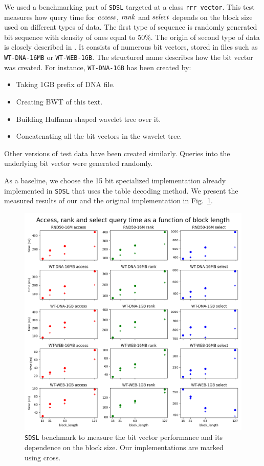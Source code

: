 We used a benchmarking part of \texttt{SDSL} targeted at a class \texttt{rrr\_vector}. This test
measures how query time for $\mathit{access}$, $\mathit{rank}$ and $\mathit{select}$ depends on the block size used on
different types of data. The first type of sequence is randomly generated bit sequence with
density of ones equal to 50\%. The origin of second type of data is closely described in
\cite{gog2014optimized}. It consists of numerous bit vectors, stored in files such as
\texttt{WT-DNA-16MB} or \texttt{WT-WEB-1GB}. The structured name describes how the bit vector
was created. For instance, \texttt{WT-DNA-1GB} has been created by:
\begin{itemize}
	\item Taking 1GB prefix of DNA file.
	\item Creating BWT of this text.
	\item Building Huffman shaped wavelet tree over it.
	\item Concatenating all the bit vectors in the wavelet tree.
\end{itemize}
Other versions of test data have been created similarly. Queries into the underlying bit vector
were generated randomly.

As a baseline, we choose the 15 bit specialized implementation already implemented in \texttt{SDSL}
that uses the table decoding method. We present the measured results of our and the original
implementation in Fig.~\ref{obr:benchmark_sdsl_new_method}.

\begin{figure}
	\centerline{
		\includegraphics[width=\textwidth, height=0.7\textheight]{images/benchmark_sdsl_new_method}
	}
	\caption[TODO]{\texttt{SDSL} benchmark to measure the bit vector performance and its dependence
	on the block size. Our implementations are marked using cross.
	}
	\label{obr:benchmark_sdsl_new_method}
\end{figure}


